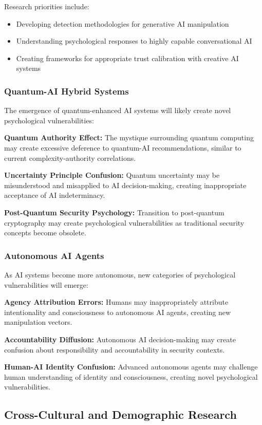 \documentclass[11pt,a4paper]{article}
\begin{document}
Research priorities include:
\begin{itemize}
\item Developing detection methodologies for generative AI manipulation
\item Understanding psychological responses to highly capable conversational AI
\item Creating frameworks for appropriate trust calibration with creative AI systems
\end{itemize}

\subsubsection{Quantum-AI Hybrid Systems}

The emergence of quantum-enhanced AI systems will likely create novel psychological vulnerabilities:

\textbf{Quantum Authority Effect:} The mystique surrounding quantum computing may create excessive deference to quantum-AI recommendations, similar to current complexity-authority correlations.

\textbf{Uncertainty Principle Confusion:} Quantum uncertainty may be misunderstood and misapplied to AI decision-making, creating inappropriate acceptance of AI indeterminacy.

\textbf{Post-Quantum Security Psychology:} Transition to post-quantum cryptography may create psychological vulnerabilities as traditional security concepts become obsolete.

\subsubsection{Autonomous AI Agents}

As AI systems become more autonomous, new categories of psychological vulnerabilities will emerge:

\textbf{Agency Attribution Errors:} Humans may inappropriately attribute intentionality and consciousness to autonomous AI agents, creating new manipulation vectors.

\textbf{Accountability Diffusion:} Autonomous AI decision-making may create confusion about responsibility and accountability in security contexts.

\textbf{Human-AI Identity Confusion:} Advanced autonomous agents may challenge human understanding of identity and consciousness, creating novel psychological vulnerabilities.

\subsection{Cross-Cultural and Demographic Research}
\end{document}
